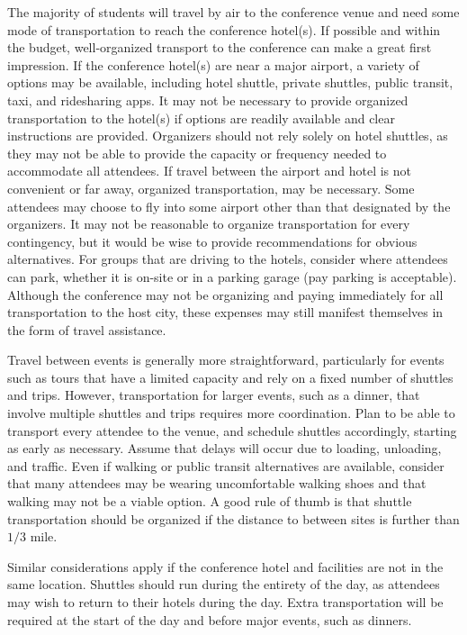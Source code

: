 \documentclass[12pt]{article}
\begin{document}
The majority of students will travel by air to the conference venue and need some mode of transportation to reach the conference hotel(s).
If possible and within the budget, well-organized transport to the conference can make a great first impression.
If the conference hotel(s) are near a major airport, a variety of options may be available, including hotel shuttle, private shuttles, public transit, taxi, and ridesharing apps.
It may not be necessary to provide organized transportation to the hotel(s) if options are readily available and clear instructions are provided.
Organizers should not rely solely on hotel shuttles, as they may not be able to provide the capacity or frequency needed to accommodate all attendees.
If travel between the airport and hotel is not convenient or far away, organized transportation,  may be necessary.
Some attendees may choose to fly into some airport other than that designated by the organizers. 
It may not be reasonable to organize transportation for every contingency, but it would be wise to provide recommendations for obvious alternatives.
For groups that are driving to the hotels, consider where attendees can park, whether it is on-site or in a parking garage (pay parking is acceptable).
Although the conference may not be organizing and paying immediately for all transportation to the host city, these expenses may still manifest themselves in the form of travel assistance.

Travel between events is generally more straightforward, particularly for events such as tours that have a limited capacity and rely on a fixed number of shuttles and trips.
However, transportation for larger events, such as a dinner, that involve multiple shuttles and trips requires more coordination.
Plan to be able to transport every attendee to the venue, and schedule shuttles accordingly, starting as early as necessary.
Assume that delays will occur due to loading, unloading, and traffic.
Even if walking or public transit alternatives are available, consider that many attendees may be wearing uncomfortable walking shoes and that walking may not be a viable option.
A good rule of thumb is that shuttle transportation should be organized if the distance to between sites is further than $1/3$ mile.

Similar considerations apply if the conference hotel and facilities are not in the same location.
Shuttles should run during the entirety of the day, as attendees may wish to return to their hotels during the day.
Extra transportation will be required at the start of the day and before major events, such as dinners.
\end{document}
